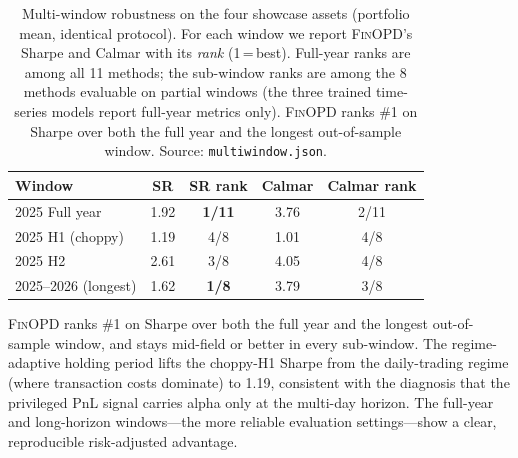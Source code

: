 \begin{table}[t]
\renewcommand{\arraystretch}{0.95}
\footnotesize
\caption{Multi-window robustness on the four showcase assets (portfolio mean, identical protocol). For each window we report \textsc{FinOPD}'s Sharpe and Calmar with its \emph{rank} (1\,=\,best). Full-year ranks are among all 11 methods; the sub-window ranks are among the 8 methods evaluable on partial windows (the three trained time-series models report full-year metrics only). \textsc{FinOPD} ranks \#1 on Sharpe over both the full year and the longest out-of-sample window. Source: \texttt{multiwindow.json}.}
\setlength{\abovecaptionskip}{0.1cm}
\centering
\setlength{\tabcolsep}{6pt}
\begin{threeparttable}
\begin{tabular}{lcccc}
\toprule
Window & SR & SR rank & Calmar & Calmar rank \\
\midrule
2025 Full year & 1.92 & \textbf{1/11} & 3.76 & 2/11 \\
2025 H1 (choppy) & 1.19 & 4/8 & 1.01 & 4/8 \\
2025 H2 & 2.61 & 3/8 & 4.05 & 4/8 \\
2025--2026 (longest) & 1.62 & \textbf{1/8} & 3.79 & 3/8 \\
\bottomrule
\end{tabular}
\begin{tablenotes}
\footnotesize
\item \textsc{FinOPD} ranks \#1 on Sharpe over both the full year and the longest out-of-sample window, and stays mid-field or better in every sub-window. The regime-adaptive holding period lifts the choppy-H1 Sharpe from the daily-trading regime (where transaction costs dominate) to 1.19, consistent with the diagnosis that the privileged PnL signal carries alpha only at the multi-day horizon. The full-year and long-horizon windows---the more reliable evaluation settings---show a clear, reproducible risk-adjusted advantage.
\end{tablenotes}
\end{threeparttable}
\label{tab:regime}
\end{table}
